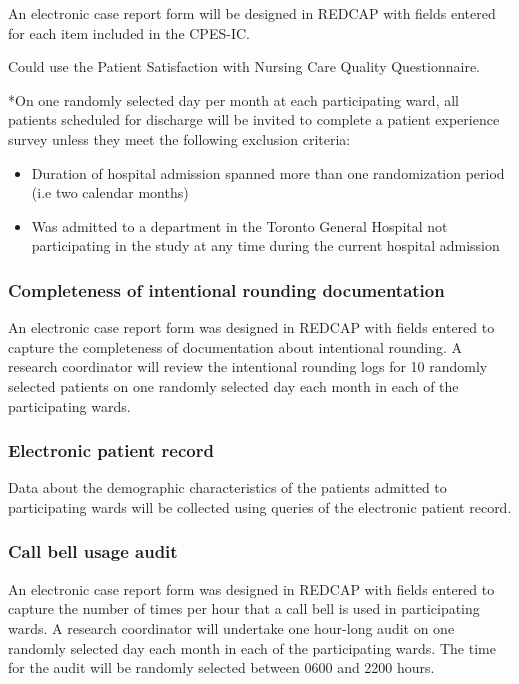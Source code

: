 \documentclass[12pt]{article}
\begin{document}
An electronic case report form will be designed in REDCAP with fields entered for each item included in the CPES-IC.

Could use the Patient Satisfaction with Nursing Care Quality Questionnaire.\cite{laschinger2005}

*On one randomly selected day per month at each participating ward, all patients scheduled for discharge will be invited to complete a patient experience survey unless they meet the following exclusion criteria:
\begin{itemize}
    \item Duration of hospital admission spanned more than one randomization period (i.e two calendar months)
    \item Was admitted to a department in the Toronto General Hospital not participating in the study at any time during the current hospital admission 
\end{itemize}

\subsubsection{Completeness of intentional rounding documentation}
An electronic case report form was designed in REDCAP with fields entered to capture the completeness of documentation about intentional rounding. A research coordinator will review the intentional rounding logs for 10 randomly selected patients on one randomly selected day each month in each of the participating wards. 


\subsubsection{Electronic patient record}
 Data about the demographic characteristics of the patients admitted to participating wards will be collected using queries of the electronic patient record. 

\subsubsection{Call bell usage audit}
An electronic case report form was designed in REDCAP with fields entered to capture the number of times per hour that a call bell is used in participating wards. A research coordinator will undertake one hour-long audit on one randomly selected day each month in each of the participating wards. The time for the audit will be randomly selected between 0600 and 2200 hours.
\end{document}
